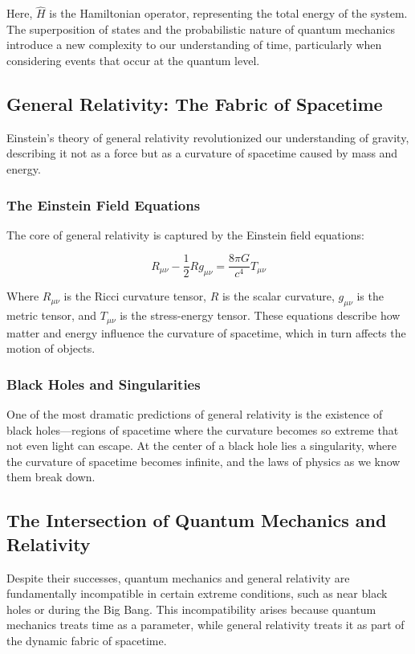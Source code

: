 \documentclass{article}
\begin{document}
Here, \( \hat{H} \) is the Hamiltonian operator, representing the total energy of the system. The superposition of states and the probabilistic nature of quantum mechanics introduce a new complexity to our understanding of time, particularly when considering events that occur at the quantum level.

\subsection{General Relativity: The Fabric of Spacetime}

Einstein's theory of general relativity revolutionized our understanding of gravity, describing it not as a force but as a curvature of spacetime caused by mass and energy.

\subsubsection{The Einstein Field Equations}

The core of general relativity is captured by the Einstein field equations:

\[
R_{\mu \nu} - \frac{1}{2} R g_{\mu \nu} = \frac{8 \pi G}{c^4} T_{\mu \nu}
\]

Where \( R_{\mu \nu} \) is the Ricci curvature tensor, \( R \) is the scalar curvature, \( g_{\mu \nu} \) is the metric tensor, and \( T_{\mu \nu} \) is the stress-energy tensor. These equations describe how matter and energy influence the curvature of spacetime, which in turn affects the motion of objects.

\subsubsection{Black Holes and Singularities}

One of the most dramatic predictions of general relativity is the existence of black holes—regions of spacetime where the curvature becomes so extreme that not even light can escape. At the center of a black hole lies a singularity, where the curvature of spacetime becomes infinite, and the laws of physics as we know them break down.

\subsection{The Intersection of Quantum Mechanics and Relativity}

Despite their successes, quantum mechanics and general relativity are fundamentally incompatible in certain extreme conditions, such as near black holes or during the Big Bang. This incompatibility arises because quantum mechanics treats time as a parameter, while general relativity treats it as part of the dynamic fabric of spacetime.
\end{document}
